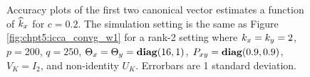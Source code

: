 \begin{figure}
  \begin{center}
    \caption{Accuracy plots of the first two canonical vector estimates a function of
      $\widehat{k}_x$ for $c=0.2$. The simulation setting is the same as Figure
      \ref{fig:chpt5:icca_convg_w1} for a rank-2 setting where $k_x=k_y=2$, $p=200$,
      $q=250$, $\Theta_x=\Theta_y=\mathop{\bf diag}(16,1)$, $P_{xy}=\mathop{\bf diag}(0.9,0.9)$, $V_K=I_2$, and non-identity
      $U_K$. Errorbars are 1 standard deviation.}
    \label{fig:chpt5:khat_c1}
  \end{center}
\end{figure}


